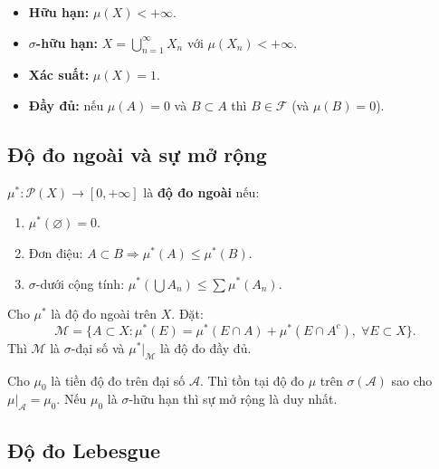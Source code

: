 \documentclass[12pt,a4paper]{article}
\begin{document}
\begin{dinhnghia}[title={Phân loại độ đo}]
  \begin{itemize}
    \item \textbf{Hữu hạn:} $\mu(X) < +\infty$.
    \item \textbf{$\sigma$-hữu hạn:} $X = \bigcup_{n=1}^{\infty} X_n$ với $\mu(X_n) < +\infty$.
    \item \textbf{Xác suất:} $\mu(X) = 1$.
    \item \textbf{Đầy đủ:} nếu $\mu(A) = 0$ và $B \subset A$ thì $B \in \mathcal{F}$ (và $\mu(B) = 0$).
  \end{itemize}
\end{dinhnghia}

\subsection{Độ đo ngoài và sự mở rộng}

\begin{dinhnghia}[title={Độ đo ngoài}]
  $\mu^*: \mathcal{P}(X) \to [0, +\infty]$ là \textbf{độ đo ngoài} nếu:
  \begin{enumerate}
    \item $\mu^*(\varnothing) = 0$.
    \item Đơn điệu: $A \subset B \Rightarrow \mu^*(A) \le \mu^*(B)$.
    \item $\sigma$-dưới cộng tính: $\mu^*\!\left(\bigcup A_n\right) \le \sum \mu^*(A_n)$.
  \end{enumerate}
\end{dinhnghia}

\begin{dinhly}[title={Định lý Carathéodory}]
  Cho $\mu^*$ là độ đo ngoài trên $X$. Đặt:
  \[
    \mathcal{M} = \{A \subset X : \mu^*(E) = \mu^*(E \cap A) + \mu^*(E \cap A^c),\; \forall E \subset X\}.
  \]
  Thì $\mathcal{M}$ là $\sigma$-đại số và $\mu^*|_{\mathcal{M}}$ là độ đo đầy đủ.
\end{dinhly}

\begin{dinhly}[title={Định lý mở rộng Carathéodory--Hahn}]
  Cho $\mu_0$ là tiền độ đo trên đại số $\mathcal{A}$. Thì tồn tại độ đo $\mu$ trên $\sigma(\mathcal{A})$ sao cho $\mu|_{\mathcal{A}} = \mu_0$. Nếu $\mu_0$ là $\sigma$-hữu hạn thì sự mở rộng là duy nhất.
\end{dinhly}

\subsection{Độ đo Lebesgue}
\end{document}
